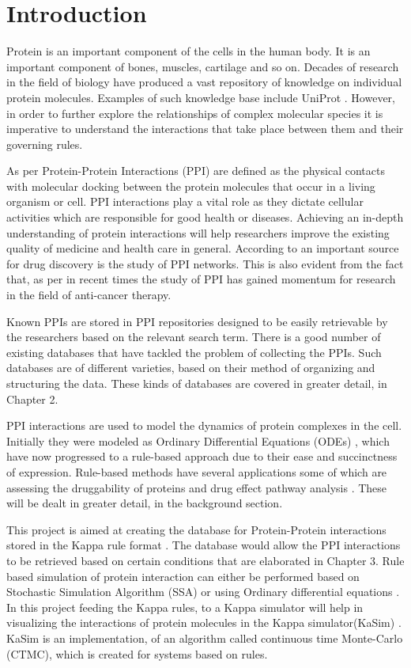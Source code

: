 \documentclass[msc,deptreport,ai]{infthesis}      %
\begin{document}
\chapter{Introduction}
Protein is an important component of the cells in the human body. It is an important component of bones, muscles, cartilage and so on. Decades of research in the field of biology have produced a vast repository of knowledge on individual protein molecules. Examples of such knowledge base include UniProt \cite{uniprot}. However, in order to further explore the relationships of complex molecular species it is imperative to understand the interactions that take place between them and their governing rules.

As per \cite{ppiDef} Protein-Protein Interactions (PPI) are defined as the physical contacts with molecular docking between the protein molecules that occur in a living organism or cell. PPI interactions play a vital role as they dictate cellular activities which are responsible for good health or diseases. Achieving an in-depth understanding of protein interactions will help researchers improve the existing quality of medicine and health care in general. According to \cite{ppimp} an important source for drug discovery is the study of PPI networks. This is also evident from the fact that, as per \cite{cancer} in recent times the study of PPI has gained momentum for research in the field of anti-cancer therapy. 

Known PPIs are stored in PPI repositories designed to be easily retrievable by the researchers based on the relevant search term. There is a good number of existing databases that have tackled the problem of collecting the PPIs. Such databases are of different varieties, based on their method of organizing and structuring the data. These kinds of databases are covered in greater detail, in Chapter 2. 

PPI interactions are used to model the dynamics of protein complexes in the cell. Initially they were modeled as Ordinary Differential Equations (ODEs) \cite{ode}, which have now progressed to a rule-based approach due to their ease and succinctness of expression. Rule-based methods have several applications some of which are assessing the druggability of proteins \cite{proteinDruggability} and drug effect pathway analysis \cite{pathwayAnalysis}. These will be dealt in greater detail, in the background section. 

This project is aimed at creating the database for Protein-Protein interactions stored in the Kappa rule format \cite{kappa}. The database would allow the PPI interactions to be retrieved based on certain conditions that are elaborated in Chapter 3. Rule based simulation of protein interaction can either be performed based on Stochastic Simulation Algorithm (SSA) or using Ordinary differential equations \cite{chylek2014rule}. In this project feeding the Kappa rules, to a Kappa simulator will help in visualizing the interactions of protein molecules in the Kappa simulator(KaSim) \cite{kasim}. KaSim is an implementation, of an algorithm called continuous time Monte-Carlo (CTMC), which is created for systems based on rules. 
\end{document}
